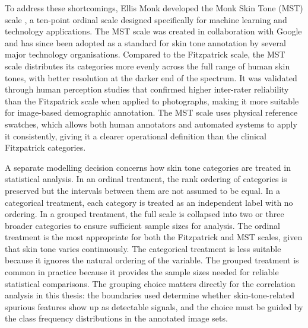 To address these shortcomings, Ellis Monk developed the Monk Skin Tone (MST) scale \cite{Schumann_2024_MonkSkinTone}, a ten-point ordinal scale designed specifically for machine learning and technology applications. The MST scale was created in collaboration with Google and has since been adopted as a standard for skin tone annotation by several major technology organisations. Compared to the Fitzpatrick scale, the MST scale distributes its categories more evenly across the full range of human skin tones, with better resolution at the darker end of the spectrum. It was validated through human perception studies that confirmed higher inter-rater reliability than the Fitzpatrick scale when applied to photographs, making it more suitable for image-based demographic annotation. The MST scale uses physical reference swatches, which allows both human annotators and automated systems to apply it consistently, giving it a clearer operational definition than the clinical Fitzpatrick categories.

A separate modelling decision concerns how skin tone categories are treated in statistical analysis. In an ordinal treatment, the rank ordering of categories is preserved but the intervals between them are not assumed to be equal. In a categorical treatment, each category is treated as an independent label with no ordering. In a grouped treatment, the full scale is collapsed into two or three broader categories to ensure sufficient sample sizes for analysis. The ordinal treatment is the most appropriate for both the Fitzpatrick and MST scales, given that skin tone varies continuously. The categorical treatment is less suitable because it ignores the natural ordering of the variable. The grouped treatment is common in practice because it provides the sample sizes needed for reliable statistical comparisons. The grouping choice matters directly for the correlation analysis in this thesis: the boundaries used determine whether skin-tone-related spurious features show up as detectable signals, and the choice must be guided by the class frequency distributions in the annotated image sets.


